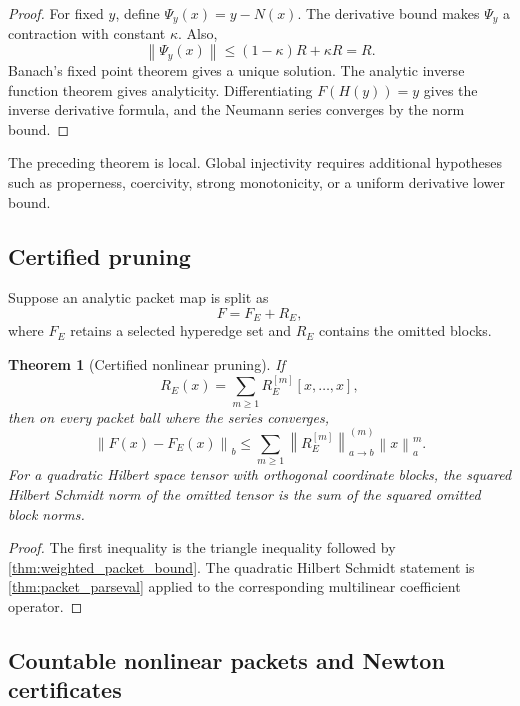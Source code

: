 \documentclass{aomart}
\newtheorem{theorem}{Theorem}[section]
\theoremstyle{definition}
\theoremstyle{remark}
\newcommand{\norm}[1]{\left\lVert#1\right\rVert}
\begin{document}
\begin{proof}
For fixed \(y\), define \(\Psi_y(x)=y-N(x)\). The derivative bound makes \(\Psi_y\) a contraction with constant \(\kappa\). Also,
\[
 \norm{\Psi_y(x)}
 \le
 (1-\kappa)R+\kappa R
 =R.
\]
Banach's fixed point theorem gives a unique solution. The analytic inverse function theorem gives analyticity. Differentiating \(F(H(y))=y\) gives the inverse derivative formula, and the Neumann series converges by the norm bound.
\end{proof}

\begin{remark}\label{rem:global_inverse_boundary}
The preceding theorem is local. Global injectivity requires additional hypotheses such as properness, coercivity, strong monotonicity, or a uniform derivative lower bound.
\end{remark}

\subsection{Certified pruning}

Suppose an analytic packet map is split as
\[
 F=F_E+R_E,
\]
where \(F_E\) retains a selected hyperedge set and \(R_E\) contains the omitted blocks.

\begin{theorem}[Certified nonlinear pruning]\label{thm:nonlinear_pruning}
If
\[
 R_E(x)=\sum_{m\ge1}R_E^{[m]}[x,\ldots,x],
\]
then on every packet ball where the series converges,
\[
 \boxed{
 \norm{F(x)-F_E(x)}_b
 \le
 \sum_{m\ge1}
 \norm{R_E^{[m]}}^{(m)}_{a\to b}
 \norm{x}_a^m.
 }
\]
For a quadratic Hilbert space tensor with orthogonal coordinate blocks, the squared Hilbert Schmidt norm of the omitted tensor is the sum of the squared omitted block norms.
\end{theorem}

\begin{proof}
The first inequality is the triangle inequality followed by \cref{thm:weighted_packet_bound}. The quadratic Hilbert Schmidt statement is \cref{thm:packet_parseval} applied to the corresponding multilinear coefficient operator.
\end{proof}

\subsection{Countable nonlinear packets and Newton certificates}
\end{document}
